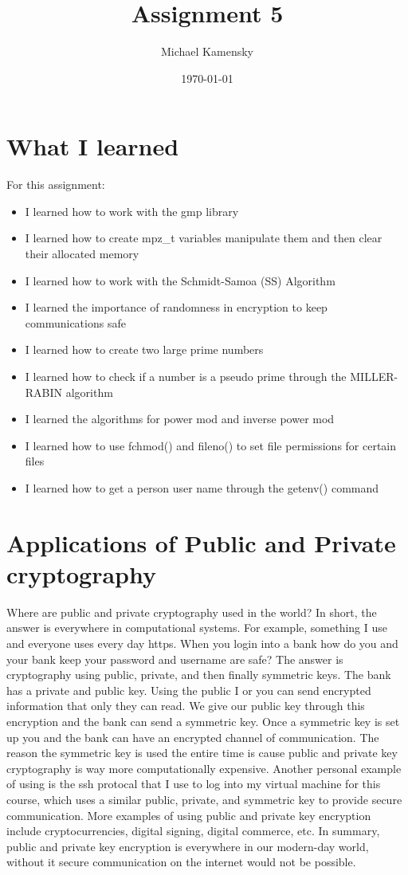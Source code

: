 \documentclass[11pt]{article} %
\title{Assignment 5}
\author{Michael Kamensky}
\date{\today} %
\begin{document}
\maketitle %
\section{What I learned}
For this assignment:
\begin{itemize}
\item I learned how to work with the gmp library
\item I learned how to create mpz\_t variables manipulate them and then clear their allocated memory
\item I learned how to work with the Schmidt-Samoa (SS) Algorithm
\item I learned the importance of randomness in encryption to keep communications safe
\item I learned how to create two large prime numbers
\item I learned how to check if a number is a pseudo prime through the MILLER-RABIN algorithm
\item I learned the algorithms for power mod and inverse power mod
\item I learned how to use fchmod() and fileno() to set file permissions for certain files
\item I learned how to get a person user name through the getenv() command
\end{itemize}
\section{Applications of Public and Private cryptography}
Where are public and private cryptography used in the world?
In short, the answer is everywhere in computational systems.
For example, something I use and everyone uses every day https.
When you login into a bank how do you and your bank keep your password and username are safe?
The answer is cryptography using public, private, and then finally symmetric keys.
The bank has a private and public key.
Using the public I or you can send encrypted information that only they can read.
We give our public key through this encryption and the bank can send a symmetric key.
Once a symmetric key is set up you and the bank can have an encrypted channel of communication.
The reason the symmetric key is used the entire time is cause public and private key cryptography is way more computationally expensive.
Another personal example of using is the ssh protocal that I use to log into my virtual machine for this course, which uses a similar public, private, and symmetric key to provide secure communication.
More examples of using public and private key encryption include cryptocurrencies, digital signing, digital commerce, etc.
In summary, public and private key encryption is everywhere in our modern-day world, without it secure communication on the internet would not be possible.
\end{document}
